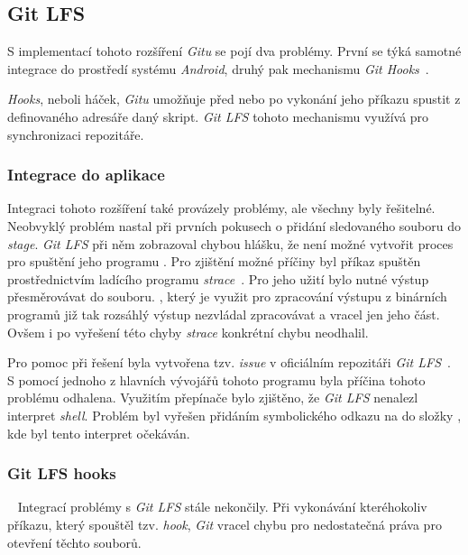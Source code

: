     \newpage
    \subsection{Git LFS}\label{sec:problemy_lfs}
    S implementací tohoto rozšíření \emph{Gitu} se pojí dva problémy. První se týká samotné integrace do prostředí systému \emph{Android}, druhý pak mechanismu \emph{Git Hooks}~.

    \emph{Hooks}, neboli háček, \emph{Gitu} umožňuje před nebo po vykonání jeho příkazu spustit z definovaného adresáře daný skript. \emph{Git LFS} tohoto mechanismu využívá pro synchronizaci repozitáře.

    \subsubsection{Integrace do aplikace}
    Integraci tohoto rozšíření také provázely problémy, ale všechny byly řešitelné. Neobvyklý problém nastal při prvních pokusech o přidání sledovaného souboru do \emph{stage}. \emph{Git LFS} při něm zobrazoval chybou hlášku, že není možné vytvořit proces pro spuštění jeho programu . Pro zjištění možné příčiny byl příkaz  spuštěn prostřednictvím ladícího programu \emph{strace}~. Pro jeho užití bylo nutné výstup přesměrovávat do souboru. , který je využit pro zpracování výstupu z binárních programů již tak rozsáhlý výstup nezvládal zpracovávat a vracel jen jeho část. Ovšem i po vyřešení této chyby \emph{strace} konkrétní chybu neodhalil.
    
    Pro pomoc při řešení byla vytvořena tzv. \emph{issue} v oficiálním repozitáři \emph{Git LFS}~. S pomocí jednoho z hlavních vývojářů tohoto programu byla příčina tohoto problému odhalena. Využitím přepínače  bylo zjištěno, že \emph{Git LFS} nenalezl interpret \emph{shell}. Problém byl vyřešen přidáním symbolického odkazu na  do složky , kde byl tento interpret očekáván.

    \subsubsection{Git LFS hooks}~\label{subsub:problemy_git_hooks}
    Integrací problémy s \emph{Git LFS} stále nekončily. Při vykonávání kteréhokoliv příkazu, který spouštěl tzv. \emph{hook}, \emph{Git} vracel chybu pro nedostatečná práva pro otevření těchto souborů.
    
